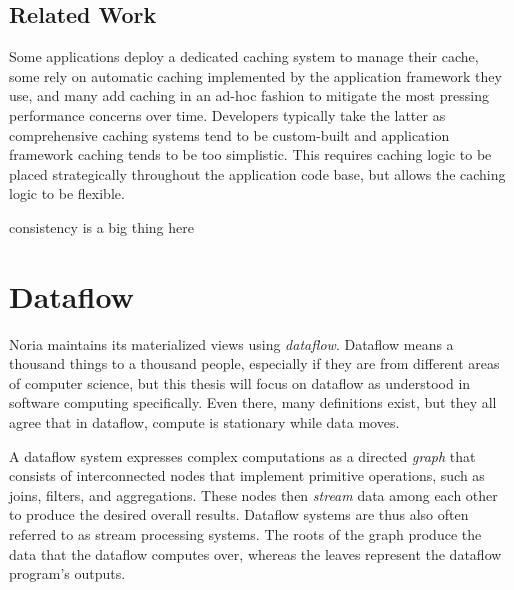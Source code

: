 \subsection{Related Work}

\resume

Some applications deploy a dedicated caching system to manage their cache, some
rely on automatic caching implemented by the application framework they use, and
many add caching in an ad-hoc fashion to mitigate the most pressing performance
concerns over time. Developers typically take the latter as comprehensive
caching systems tend to be custom-built and application framework caching tends
to be too simplistic. This requires caching logic to be placed strategically
throughout the application code base, but allows the caching logic to be
flexible.

\begin{comment}
https://www.inf.ufrgs.br/prosoft/publications/2016/mertz-tse-2016-pre-print.pdf
https://people.csail.mit.edu/nickolai/papers/gupta-cachegenie.pdf
https://slack.engineering/flannel-an-application-level-edge-cache-to-make-slack-scale/
https://core.ac.uk/download/pdf/208550345.pdf
https://citeseerx.ist.psu.edu/viewdoc/download?doi=10.1.1.465.343&rep=rep1&type=pdf
https://ieeexplore.ieee.org/document/1319994
\end{comment}

consistency is a big thing here

\section{Dataflow}

Noria maintains its materialized views using \textit{dataflow}. Dataflow means a
thousand things to a thousand people, especially if they are from different
areas of computer science, but this thesis will focus on dataflow as understood
in software computing specifically. Even there, many definitions exist, but they
all agree that in dataflow, compute is stationary while data moves.

A dataflow system expresses complex computations as a directed \emph{graph} that
consists of interconnected nodes that implement primitive operations, such as
joins, filters, and aggregations. These nodes then \emph{stream} data among each
other to produce the desired overall results. Dataflow systems are thus also
often referred to as stream processing systems. The roots of the graph produce
the data that the dataflow computes over, whereas the leaves represent the
dataflow program's outputs.

